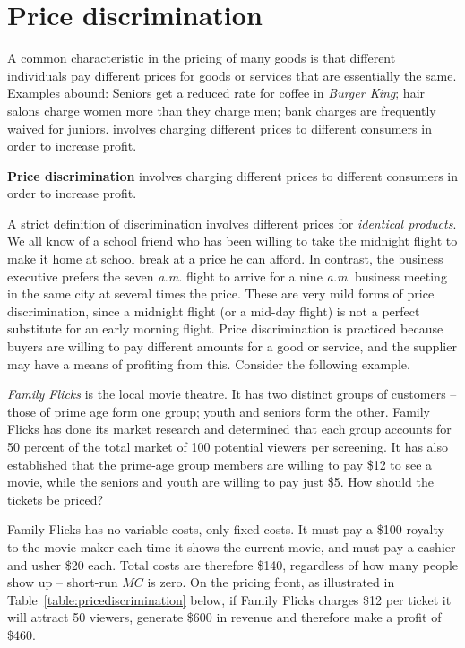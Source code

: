 \section{Price discrimination}\label{sec:ch10sec5}

A common characteristic in the pricing of many goods is that different individuals pay different prices for goods or services that are essentially the same. Examples abound: Seniors get a reduced rate for coffee in \textit{Burger King}; hair salons charge women more than they charge men; bank charges are frequently waived for juniors.  involves charging different prices to different consumers in order to increase profit.

\begin{DefBox}
\textbf{Price discrimination} involves charging different prices to different consumers in order to increase profit.
\end{DefBox}

A strict definition of discrimination involves different prices for \textit{identical products}. We all know of a school friend who has been willing to take the midnight flight to make it home at school break at a price he can afford. In contrast, the business executive prefers the seven \textit{a.m.} flight to arrive for a nine \textit{a.m}. business meeting in the same city at several times the price. These are very mild forms of price discrimination, since a midnight flight (or a mid-day flight) is not a perfect substitute for an early morning flight. Price discrimination is practiced because buyers are willing to pay different amounts for a good or service, and the supplier may have a means of profiting from this. Consider the following example.

\textit{Family Flicks} is the local movie theatre. It has two distinct groups of customers -- those of prime age form one group; youth and seniors form the other.  Family Flicks has done its market research and determined that each group accounts for 50 percent of the total market of 100 potential viewers per screening. It has also established that the prime-age group members are willing to pay \$12 to see a movie, while the seniors and youth are willing to pay just \$5. How should the tickets be priced?

Family Flicks has no variable costs, only fixed costs.  It must pay a \$100 royalty to the movie maker each time it shows the current movie, and must pay a cashier and usher \$20 each.  Total costs are therefore \$140, regardless of how many people show up -- short-run $MC$ is zero. On the pricing front, as illustrated in Table~\ref{table:pricediscrimination} below, if Family Flicks charges \$12 per ticket it will attract 50 viewers, generate \$600 in revenue and therefore make a profit of \$460. 

